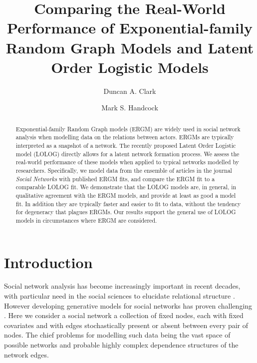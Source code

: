 \documentclass[
]{statsoc}
\title[ERGM and LOLOG Real-World Performance]{Comparing the Real-World Performance of Exponential-family Random Graph Models and Latent Order Logistic Models}
\author[Duncan A. Clark]{Duncan A. Clark}
\author[Mark S. Handcock]{Mark S. Handcock}
\author{}
\date{\vspace{-2.5em}}
\begin{document}
\newcommand{\R}{\mathbb{R}}
\newcommand{\N}{\mathbb{N}}
\newcommand{\E}{\mathbb{E}}
\newcommand{\V}{\mathbb{V}}
\newcommand{\bfR}{\mathbf{R}}
\newcommand{\bfX}{\mathbf{X}}
\newcommand{\bfW}{\mathbf{W}}
\newcommand{\bfD}{\mathbf{D}}
\newcommand{\INT}{\int_{-\infty}^{+\infty}}
\newcommand{\p}{\partial}
\newcommand{\ra}{\Rightarrow}
\newcommand{\dH}{d\mathscr{H}}
\newcommand{\ch}{\text{cosh}}
\newcommand{\sh}{\text{sinh}}
\newcommand{\ex}{\mathbb{E}\left[X\right]}
\newcommand{\ey}{\mathbb{E}\left[Y\right]}
\newcommand{\logit}{{\rm logit}}
\newcommand{\MOM}{{\rm MOM}}

\setcounter{secnumdepth}{4}

\begin{abstract}
Exponential-family Random Graph models (ERGM) are widely used in social network analysis when modelling data on the relations between actors. ERGMs are typically interpreted as a snapshot of a network. The recently proposed Latent Order Logistic model (LOLOG) directly allows for a latent network formation process. We assess the real-world performance of these models when applied to typical networks modelled by researchers. Specifically, 
we model data from the ensemble of articles in the journal \textit{Social Networks} with published ERGM fits, and compare the ERGM fit to a comparable LOLOG fit. We demonstrate that the LOLOG models are, in general, in qualitative agreement with the ERGM models, and provide at least as good a model fit. In addition they are typically faster and easier to fit to data, without the tendency for degeneracy that plagues ERGMs.
Our results support the general use of LOLOG models in circumstances where ERGM are considered.
\end{abstract}

\section{Introduction}

Social network analysis has become increasingly important in recent
decades, with particular need in the social sciences to elucidate
relational structure \citep{Goldenberg2010}. However developing
generative models for social networks has proven challenging
\citep{chatterjee2013}. Here we consider a social network a collection
of fixed nodes, each with fixed covariates and with edges stochastically
present or absent between every pair of nodes. The chief problems for
modelling such data being the vast space of possible networks and
probable highly complex dependence structures of the network edges.
\end{document}
